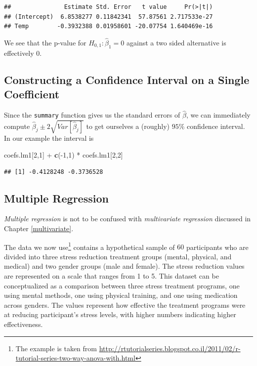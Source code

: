 \documentclass[]{book}
\newenvironment{Shaded}{\begin{snugshade}}{\end{snugshade}}
\newcommand{\KeywordTok}[1]{\textcolor[rgb]{0.13,0.29,0.53}{\textbf{{#1}}}}
\newcommand{\DecValTok}[1]{\textcolor[rgb]{0.00,0.00,0.81}{{#1}}}
\newcommand{\StringTok}[1]{\textcolor[rgb]{0.31,0.60,0.02}{{#1}}}
\newcommand{\NormalTok}[1]{{#1}}
\theoremstyle{definition}
\theoremstyle{definition}
\theoremstyle{remark}
\let\BeginKnitrBlock\begin \let\EndKnitrBlock\end
\begin{document}
\begin{verbatim}
##               Estimate Std. Error   t value     Pr(>|t|)
## (Intercept)  6.8538277 0.11842341  57.87561 2.717533e-27
## Temp        -0.3932388 0.01958601 -20.07754 1.640469e-16
\end{verbatim}

We see that the p-value for \(H_{0,1}:\hat \beta_1=0\) against a two
sided alternative is effectively 0.

\subsection{Constructing a Confidence Interval on a Single
Coefficient}\label{constructing-a-confidence-interval-on-a-single-coefficient}

Since the \texttt{summary} function gives us the standard errors of
\(\hat \beta\), we can immediately compute
\(\hat \beta_j \pm 2 \sqrt{Var[\hat \beta_j]}\) to get ourselves a
(roughly) \(95\%\) confidence interval. In our example the interval is

\begin{Shaded}
\begin{Highlighting}[]
\NormalTok{coefs.lm1[}\DecValTok{2}\NormalTok{,}\DecValTok{1}\NormalTok{] +}\StringTok{ }\KeywordTok{c}\NormalTok{(-}\DecValTok{1}\NormalTok{,}\DecValTok{1}\NormalTok{) *}\StringTok{ }\NormalTok{coefs.lm1[}\DecValTok{2}\NormalTok{,}\DecValTok{2}\NormalTok{]}
\end{Highlighting}
\end{Shaded}

\begin{verbatim}
## [1] -0.4128248 -0.3736528
\end{verbatim}

\subsection{Multiple Regression}\label{multiple-regression}

\BeginKnitrBlock{remark}
\emph{Multiple regression} is not to be confused
with \emph{multivariate regression} discussed in Chapter
\ref{multivariate}.
\EndKnitrBlock{remark}

The data we now use\footnote{The example is taken from
  \url{http://rtutorialseries.blogspot.co.il/2011/02/r-tutorial-series-two-way-anova-with.html}}
contains a hypothetical sample of \(60\) participants who are divided
into three stress reduction treatment groups (mental, physical, and
medical) and two gender groups (male and female). The stress reduction
values are represented on a scale that ranges from 1 to 5. This dataset
can be conceptualized as a comparison between three stress treatment
programs, one using mental methods, one using physical training, and one
using medication across genders. The values represent how effective the
treatment programs were at reducing participant's stress levels, with
higher numbers indicating higher effectiveness.
\end{document}
